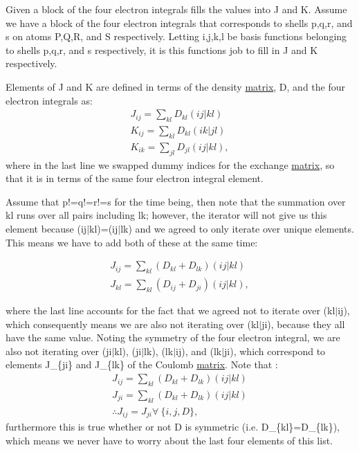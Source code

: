 Given a block of the four electron integrals fills the values into J and K. Assume we have a block of the four electron integrals that corresponds to shells p,q,r, and s on atoms P,Q,R, and S respectively. Letting i,j,k,l be basis functions belonging to shells p,q,r, and s respectively, it is this functions job to fill in J and K respectively.

Elements of J and K are defined in terms of the density \hyperlink{classJKBuilder_1_1matrix}{matrix}, D, and the four electron integrals as: \begin{eqnarray*} J_{ij}=\sum_{kl}D_{kl}(ij|kl)\\ K_{ij}=\sum_{kl}D_{kl}(ik|jl)\\ K_{ik}=\sum_{jl}D_{jl}(ij|kl), \end{eqnarray*} where in the last line we swapped dummy indices for the exchange \hyperlink{classJKBuilder_1_1matrix}{matrix}, so that it is in terms of the same four electron integral element.

Assume that p!=q!=r!=s for the time being, then note that the summation over kl runs over all pairs including lk; however, the iterator will not give us this element because (ij$|$kl)=(ij$|$lk) and we agreed to only iterate over unique elements. This means we have to add both of these at the same time:

\begin{eqnarray*} J_{ij}=\sum_{kl}\left(D_{kl}+D_{lk}\right)(ij|kl)\\ J_{kl}=\sum_{kl}\left(D_{ij}+D_{ji}\right)(ij|kl), \end{eqnarray*}

where the last line accounts for the fact that we agreed not to iterate over (kl$|$ij), which consequently means we are also not iterating over (kl$|$ji), because they all have the same value. Noting the symmetry of the four electron integral, we are also not iterating over (ji$|$kl), (ji$|$lk), (lk$|$ij), and (lk$|$ji), which correspond to elements J\_\-\{ji\} and J\_\-\{lk\} of the Coulomb \hyperlink{classJKBuilder_1_1matrix}{matrix}. Note that : \begin{eqnarray*} J_{ij}=\sum_{kl}\left(D_{kl}+D_{lk}\right)(ij|kl)\\ J_{ji}=\sum_{kl}\left(D_{kl}+D_{lk}\right)(ij|kl)\\ \therefore J_{ij}=J_{ji}\forall\ \{i,j,D\}, \end{eqnarray*} furthermore this is true whether or not D is symmetric (i.e. D\_\-\{kl\}=D\_\-\{lk\}), which means we never have to worry about the last four elements of this list.

